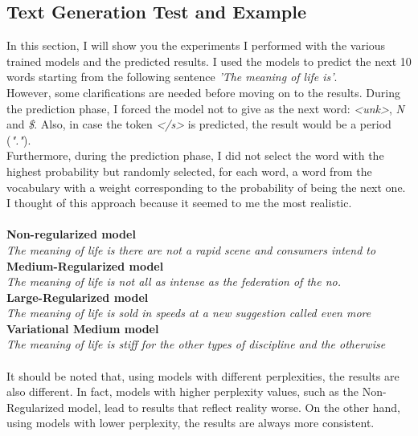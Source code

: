 \documentclass[a4paper]{article}
\begin{document}
\subsection{Text Generation Test and Example}
In this section, I will show you the experiments I performed with the various trained models and the predicted results. I used the models to predict the next 10 words starting from the following sentence \textit{'The meaning of life is'}.
\\
However, some clarifications are needed before moving on to the results. During the prediction phase, I forced the model not to give as the next word: \textit{\textless unk\textgreater}, \textit{N} and \textit{\$}. Also, in case the token \textit{\textless /s\textgreater} is predicted, the result would be a period (\textit{"."}).
\\
Furthermore, during the prediction phase, I did not select the word with the highest probability but randomly selected, for each word, a word from the vocabulary with a weight corresponding to the probability of being the next one. I thought of this approach because it seemed to me the most realistic.
\\
\\
\textbf{Non-regularized model}
\\
\textit{The meaning of life is there are not a rapid scene and consumers intend to}
\\
\textbf{Medium-Regularized model}
\\
\textit{The meaning of life is not all as intense as the federation of the no.}
\\
\textbf{Large-Regularized model}
\\
\textit{The meaning of life is sold in speeds at a new suggestion called even more}
\\    
\textbf{Variational Medium model}
\\
\textit{The meaning of life is stiff for the other types of discipline and the otherwise}
\\
\\
It should be noted that, using models with different perplexities, the results are also different. In fact, models with higher perplexity values, such as the Non-Regularized model, lead to results that reflect reality worse. On the other hand, using models with lower perplexity, the results are always more consistent.
\end{document}
